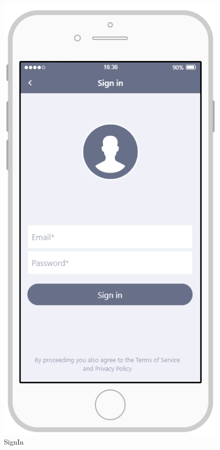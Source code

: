 \documentclass{article}
\begin{document}
\begin{figure}[H]
    \centering
    \includegraphics[scale=0.7]{Images/SignInAPP}
    \caption{SignIn}
\end{figure}
\end{document}
